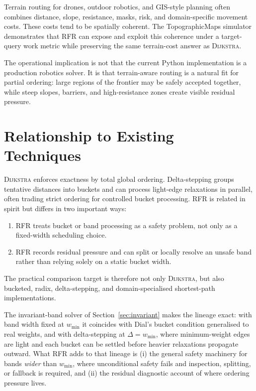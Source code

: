 \documentclass[11pt]{article}
\newcommand{\RFR}{\textsc{RFR}}
\newcommand{\Dijkstra}{\textsc{Dijkstra}}
\begin{document}
Terrain routing for drones, outdoor robotics, and GIS-style planning often combines distance, slope, resistance, masks, risk, and domain-specific movement costs. These costs tend to be spatially coherent. The TopographicMaps simulator demonstrates that \RFR{} can expose and exploit this coherence under a target-query work metric while preserving the same terrain-cost answer as \Dijkstra{}.

The operational implication is not that the current Python implementation is a production robotics solver. It is that terrain-aware routing is a natural fit for partial ordering: large regions of the frontier may be safely accepted together, while steep slopes, barriers, and high-resistance zones create visible residual pressure.

\section{Relationship to Existing Techniques}

\Dijkstra{} enforces exactness by total global ordering. Delta-stepping \cite{meyer2003} groups tentative distances into buckets and can process light-edge relaxations in parallel, often trading strict ordering for controlled bucket processing. \RFR{} is related in spirit but differs in two important ways:

\begin{enumerate}
  \item \RFR{} treats bucket or band processing as a safety problem, not only as a fixed-width scheduling choice.
  \item \RFR{} records residual pressure and can split or locally resolve an unsafe band rather than relying solely on a static bucket width.
\end{enumerate}

The practical comparison target is therefore not only \Dijkstra{}, but also bucketed, radix, delta-stepping, and domain-specialised shortest-path implementations.

The invariant-band solver of Section~\ref{sec:invariant} makes the lineage exact: with band width fixed at $w_{\min}$ it coincides with Dial's bucket condition \cite{dial1969} generalised to real weights, and with delta-stepping at $\Delta=w_{\min}$, where minimum-weight edges are light and each bucket can be settled before heavier relaxations propagate outward. What \RFR{} adds to that lineage is (i) the general safety machinery for bands \emph{wider} than $w_{\min}$, where unconditional safety fails and inspection, splitting, or fallback is required, and (ii) the residual diagnostic account of where ordering pressure lives.
\end{document}
